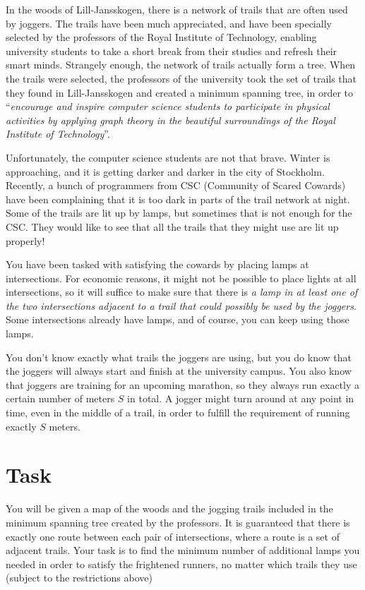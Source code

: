 

In the woods of Lill-Jansskogen, there is a network of trails that are often used by joggers. The
trails have been much appreciated, and have been specially selected by the professors of the Royal
Institute of Technology, enabling university students to take a short break from their studies and
refresh their smart minds. Strangely enough, the network of trails actually form a tree. When the
trails were selected, the professors of the university took the set of trails that they found in
Lill-Jansskogen and created a minimum spanning tree, in order to “\emph{encourage and inspire
computer science students to participate in physical activities by applying graph theory in the
beautiful surroundings of the Royal Institute of Technology}”.


Unfortunately, the computer science students are not that brave. Winter is approaching, and it is
getting darker and darker in the city of Stockholm. Recently, a bunch of programmers from CSC
(Community of Scared Cowards) have been complaining that it is too dark in parts of the trail
network at night. Some of the trails are lit up by lamps, but sometimes that is not enough for the
CSC\@. They would like to see that all the trails that they might use are lit up properly!


You have been tasked with satisfying the cowards by placing lamps at intersections. For
economic reasons, it might not be possible to place lights at all intersections, so it will suffice
to make sure that there is \emph{a lamp in at least one of the two intersections adjacent to a trail
that could possibly be used by the joggers}. Some intersections already have lamps, and of course, you can
keep using those lamps.

You don't know exactly what trails the joggers are using, but you do know that the joggers will always start and finish
at the university campus. You also know that joggers are training for an upcoming marathon, so they always run exactly a certain number of meters $S$ in total. A jogger might turn around at any point in time, even in the middle of
a trail, in order to fulfill the requirement of running exactly $S$ meters.


\section*{Task}
You will be given a map of the woods and the jogging trails included in the minimum spanning tree
created by the professors. It is guaranteed that there is exactly one route between each pair of
intersections, where a route is a set of adjacent trails. 
Your task is to find the minimum number of additional lamps you needed in order to satisfy the frightened runners, no matter which trails they use (subject to the restrictions above)


